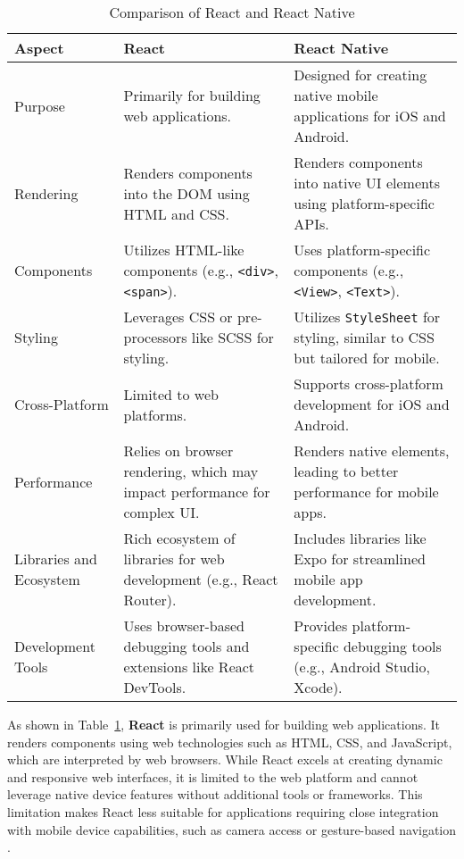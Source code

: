 \begin{table}[h]
    \centering
    \begin{tabular}{|p{3.5cm}|p{4.5cm}|p{4.5cm}|}
        \hline
        \textbf{Aspect} & \textbf{React} & \textbf{React Native} \\
        \hline
        Purpose & Primarily for building web applications. & Designed for creating native mobile applications for iOS and Android. \\
        \hline
        Rendering & Renders components into the DOM using HTML and CSS. & Renders components into native UI elements using platform-specific APIs. \\
        \hline
        Components & Utilizes HTML-like components (e.g., \texttt{<div>}, \texttt{<span>}). & Uses platform-specific components (e.g., \texttt{<View>}, \texttt{<Text>}). \\
        \hline
        Styling & Leverages CSS or pre-processors like SCSS for styling. & Utilizes \texttt{StyleSheet} for styling, similar to CSS but tailored for mobile. \\
        \hline
        Cross-Platform & Limited to web platforms. & Supports cross-platform development for iOS and Android. \\
        \hline
        Performance & Relies on browser rendering, which may impact performance for complex UI. & Renders native elements, leading to better performance for mobile apps. \\
        \hline
        Libraries and Ecosystem & Rich ecosystem of libraries for web development (e.g., React Router). & Includes libraries like Expo for streamlined mobile app development. \\
        \hline
        Development Tools & Uses browser-based debugging tools and extensions like React DevTools. & Provides platform-specific debugging tools (e.g., Android Studio, Xcode). \\
        \hline
    \end{tabular}
    \caption{Comparison of React and React Native}
    \label{tab:react-comparison}
\end{table}

As shown in Table~\ref{tab:react-comparison}, \textbf{React} is primarily used for building web applications. It renders components using web technologies such as HTML, CSS, and JavaScript, which are interpreted by web browsers. While React excels at creating dynamic and responsive web interfaces, it is limited to the web platform and cannot leverage native device features without additional tools or frameworks. This limitation makes React less suitable for applications requiring close integration with mobile device capabilities, such as camera access or gesture-based navigation .

